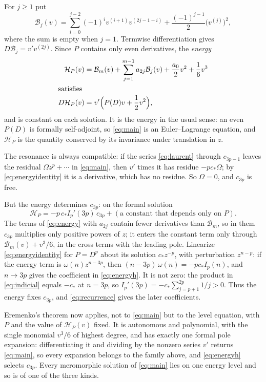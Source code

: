 For \(j\ge1\) put
\begin{equation}\label{eq:energyterms}
 \mathcal B_j(v)=\sum_{i=0}^{j-2}(-1)^iv^{(i+1)}v^{(2j-1-i)}
 +\frac{(-1)^{j-1}}2\bigl(v^{(j)}\bigr)^2,
\end{equation}
where the sum is empty when \(j=1\). Termwise differentiation gives
\(D\mathcal B_j=v'v^{(2j)}\). Since \(P\) contains only even
derivatives, the \emph{energy}
\begin{align}
 \mathcal H_P(v)&=\mathcal B_m(v)+\sum_{j=1}^{m-1}a_{2j}\mathcal B_j(v)
 +\frac{a_0}{2}v^2+\frac16v^3\label{eq:energy}\\
\shortintertext{satisfies}
 D\mathcal H_P(v)&=v'\Bigl(P(D)v+\frac12v^2\Bigr),\label{eq:energyidentity}
\end{align}
and is constant on each solution. It is the energy in the usual sense:
an even \(P(D)\) is formally self-adjoint, so \eqref{eq:main} is an
Euler--Lagrange equation, and \(\mathcal H_P\) is the quantity conserved
by its invariance under translation in \(z\).

The resonance is always compatible: if the series \eqref{eq:laurent}
through \(c_{3p-1}\) leaves the residual \(\Omega z^p+\cdots\) in
\eqref{eq:main}, then \(v'\) times it has residue \(-pc_\ast\Omega\); by
\eqref{eq:energyidentity} it is a derivative, which has no residue. So
\(\Omega=0\), and \(c_{3p}\) is free.

But the energy determines \(c_{3p}\): on the formal solution
\begin{equation}\label{eq:energyh}
 \mathcal H_P=-p\,c_\ast I_p'(3p)\,c_{3p}
 +(\text{a constant that depends only on }P).
\end{equation}
The terms of \eqref{eq:energy} with \(a_{2j}\) contain fewer derivatives
than \(\mathcal B_m\), so in them \(c_{3p}\) multiplies only positive
powers of \(z\); it enters the constant term only through
\(\mathcal B_m(v)+v^3/6\), in the cross terms with the leading pole.
Linearize \eqref{eq:energyidentity} for \(P=D^p\) about its solution
\(c_\ast z^{-p}\), with perturbation \(z^{n-p}\): if the energy term is
\(\omega(n)z^{n-3p}\), then \((n-3p)\,\omega(n)=-pc_\ast I_p(n)\), and
\(n\to3p\) gives the coefficient in \eqref{eq:energyh}. It is not zero:
the product in \eqref{eq:indicial} equals \(-c_\ast\) at \(n=3p\), so
\(I_p'(3p)=-c_\ast\sum_{j=p+1}^{2p}1/j>0\). Thus the energy fixes
\(c_{3p}\), and \eqref{eq:recurrence} gives the later coefficients.

Eremenko's theorem now applies, not to \eqref{eq:main} but to the level
equation, with \(P\) and the value of \(\mathcal H_P(v)\) fixed. It is
autonomous and polynomial, with the single monomial \(v^3/6\) of highest
degree, and has exactly one formal pole expansion: differentiating it
and dividing by the nonzero series \(v'\) returns \eqref{eq:main}, so
every expansion belongs to the family above, and \eqref{eq:energyh}
selects \(c_{3p}\). Every meromorphic solution of \eqref{eq:main} lies
on one energy level and so is of one of the three kinds.

